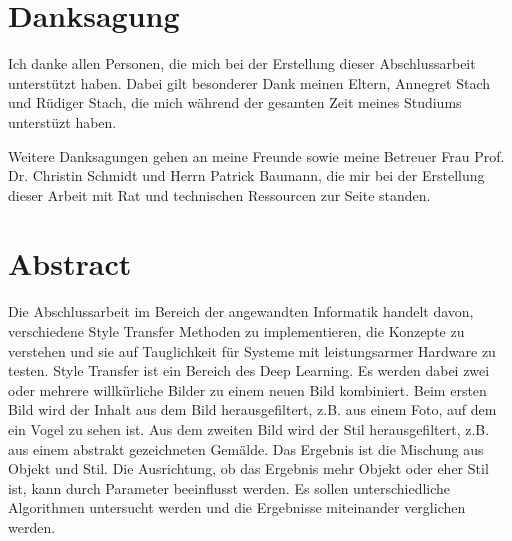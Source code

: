\chapter*{Danksagung}

Ich danke allen Personen, die mich bei der Erstellung dieser Abschlussarbeit unterstützt haben. Dabei gilt besonderer Dank meinen Eltern, Annegret Stach und Rüdiger Stach, die mich während der gesamten Zeit meines Studiums unterstüzt haben.

Weitere Danksagungen gehen an meine Freunde sowie meine Betreuer Frau Prof. Dr. Christin Schmidt und Herrn Patrick Baumann, die mir bei der Erstellung dieser Arbeit mit Rat und technischen Ressourcen zur Seite standen.

\pagebreak

\chapter*{Abstract}


Die Abschlussarbeit im Bereich der angewandten Informatik handelt davon, verschiedene Style Transfer Methoden zu implementieren, die Konzepte zu verstehen und sie auf Tauglichkeit für Systeme mit leistungsarmer Hardware zu testen. Style Transfer ist ein Bereich des Deep Learning. Es werden dabei zwei oder mehrere willkürliche Bilder zu einem neuen Bild kombiniert. Beim ersten Bild wird der Inhalt aus dem Bild herausgefiltert, z.B. aus einem Foto, auf dem ein Vogel zu sehen ist. Aus dem zweiten Bild wird der Stil herausgefiltert, z.B. aus einem abstrakt gezeichneten Gemälde. Das Ergebnis ist die Mischung aus Objekt und Stil. Die Ausrichtung, ob das Ergebnis mehr Objekt oder eher Stil ist, kann durch Parameter beeinflusst werden. Es sollen unterschiedliche Algorithmen untersucht werden und die Ergebnisse miteinander verglichen werden.